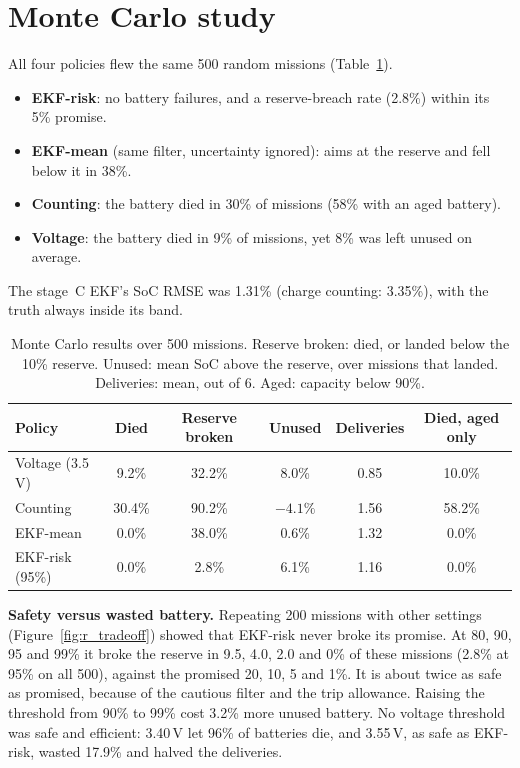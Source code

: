 \section{Monte Carlo study}\label{sec:r_mc}

All four policies flew the same 500 random missions (Table~\ref{tab:r_mc}).
\begin{itemize}
  \item \textbf{EKF-risk}: no battery failures, and a reserve-breach rate (2.8\%) within its 5\% promise.
  \item \textbf{EKF-mean} (same filter, uncertainty ignored): aims at the reserve and fell below it in 38\%.
  \item \textbf{Counting}: the battery died in 30\% of missions (58\% with an aged battery).
  \item \textbf{Voltage}: the battery died in 9\% of missions, yet 8\% was left unused on average.
\end{itemize}
The stage~C EKF's SoC RMSE was 1.31\% (charge counting: 3.35\%), with the truth always inside its band.

\begin{table}[htbp]
  \centering
  \caption[Monte Carlo results over 500 missions.]{Monte Carlo results over 500 missions. Reserve broken: died, or landed below the 10\% reserve. Unused: mean SoC above the reserve, over missions that landed. Deliveries: mean, out of 6. Aged: capacity below 90\%.}
  \label{tab:r_mc}
  \small
  \setlength{\tabcolsep}{3pt}
  \begin{tabular}{@{}lccccc@{}}
    \toprule
    Policy & Died & Reserve broken & Unused & Deliveries & Died, aged only \\
    \midrule
    Voltage (3.5\,V)                 & 9.2\%  & 32.2\% & 8.0\%    & 0.85 & 10.0\% \\
    Counting                         & 30.4\% & 90.2\% & $-4.1\%$ & 1.56 & 58.2\% \\
    EKF-mean                         & 0.0\%  & 38.0\% & 0.6\%    & 1.32 & 0.0\% \\
    EKF-risk (95\%)                  & 0.0\%  & 2.8\%  & 6.1\%    & 1.16 & 0.0\% \\
    \bottomrule
  \end{tabular}
\end{table}

\label{sec:r_sweep}\textbf{Safety versus wasted battery.} Repeating 200 missions with other settings (Figure~\ref{fig:r_tradeoff}) showed that EKF-risk never broke its promise. At 80, 90, 95 and 99\% it broke the reserve in 9.5, 4.0, 2.0 and 0\% of these missions (2.8\% at 95\% on all 500), against the promised 20, 10, 5 and 1\%. It is about twice as safe as promised, because of the cautious filter and the trip allowance. Raising the threshold from 90\% to 99\% cost 3.2\% more unused battery. No voltage threshold was safe and efficient: 3.40\,V let 96\% of batteries die, and 3.55\,V, as safe as EKF-risk, wasted 17.9\% and halved the deliveries.
